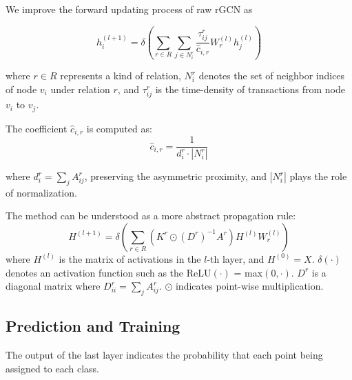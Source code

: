 
We improve the forward updating process of raw rGCN as 

\begin{equation}
h_i^{(l+1)}=\delta(\sum_{r\in R} \sum_{j \in N_i^r} \frac{\tau_{ij}^r}{\hat c_{i,r}}W_r^{(l)}h_j^{(l)})
\end{equation}

\noindent where $r \in R$ represents a kind of relation, $N_i^r$ denotes the set of neighbor indices of node $v_i$ under relation $r$, and $\tau_{ij}^r$ is the time-density of transactions from node $v_i$ to $v_j$. 

The coefficient $\hat c_{i,r}$ is computed as:
\begin{equation}
\hat c_{i,r}=\frac{1}{d_i^r\cdot |N_i^r|}
\end{equation}

\noindent where $d_i^r=\sum_{j}A^r_{ij}$, preserving the asymmetric proximity, and $|N_i^r|$ plays the role of normalization.

The method can be understood as a more abstract propagation rule:
\begin{equation}
H^{(l+1)}=\delta(\sum_{r\in R} (K^r\odot (D^r)^{-1}A^r)H^{(l)}W_r^{(l)})
\end{equation}
\noindent where $H^{(l)}$ is the matrix of activations in the $l$-th layer, and $H^{(0)}=X$. $\delta(\cdot)$ denotes an activation function such as the ReLU$(\cdot)$ = max$(0,\cdot)$. $D^r$ is a diagonal matrix where $D^r_{ii}=\sum_{j}A^r_{ij}$. $\odot$ indicates point-wise multiplication.

\subsection{Prediction and Training}
The output of the last layer indicates the probability that each point being assigned to each class.

